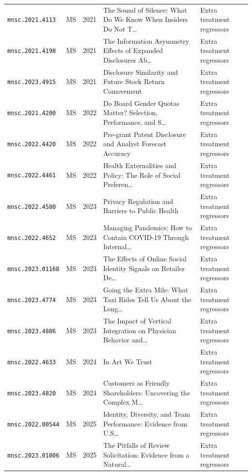 \begin{longtable}{lccp{}l}
\texttt{mnsc.2021.4113} & MS & 2021 & \raggedright The Sound of Silence: What Do We Know When Insiders Do Not T\ldots{} & Extra treatment regressors \\
\texttt{mnsc.2021.4198} & MS & 2021 & \raggedright The Information Asymmetry Effects of Expanded Disclosures Ab\ldots{} & Extra treatment regressors \\
\texttt{mnsc.2023.4915} & MS & 2021 & \raggedright Disclosure Similarity and Future Stock Return Comovement & Extra treatment regressors \\
\texttt{mnsc.2021.4200} & MS & 2022 & \raggedright Do Board Gender Quotas Matter? Selection, Performance, and S\ldots{} & Extra treatment regressors \\
\texttt{mnsc.2022.4420} & MS & 2022 & \raggedright Pre-grant Patent Disclosure and Analyst Forecast Accuracy & Extra treatment regressors \\
\texttt{mnsc.2022.4461} & MS & 2022 & \raggedright Health Externalities and Policy: The Role of Social Preferen\ldots{} & Extra treatment regressors \\
\texttt{mnsc.2022.4580} & MS & 2023 & \raggedright Privacy Regulation and Barriers to Public Health & Extra treatment regressors \\
\texttt{mnsc.2022.4652} & MS & 2023 & \raggedright Managing Pandemics: How to Contain COVID-19 Through Internal\ldots{} & Extra treatment regressors \\
\texttt{mnsc.2023.01168} & MS & 2023 & \raggedright The Effects of Online Social Identity Signals on Retailer De\ldots{} & Extra treatment regressors \\
\texttt{mnsc.2023.4774} & MS & 2023 & \raggedright Going the Extra Mile: What Taxi Rides Tell Us About the Long\ldots{} & Extra treatment regressors \\
\texttt{mnsc.2023.4886} & MS & 2023 & \raggedright The Impact of Vertical Integration on Physician Behavior and\ldots{} & Extra treatment regressors \\
\texttt{mnsc.2022.4633} & MS & 2024 & \raggedright In Art We Trust & Extra treatment regressors \\
\texttt{mnsc.2023.4820} & MS & 2024 & \raggedright Customers as Friendly Shareholders: Uncovering the Complex M\ldots{} & Extra treatment regressors \\
\texttt{mnsc.2022.00544} & MS & 2025 & \raggedright Identity, Diversity, and Team Performance: Evidence from U.S\ldots{} & Extra treatment regressors \\
\texttt{mnsc.2023.01006} & MS & 2025 & \raggedright The Pitfalls of Review Solicitation: Evidence from a Natural\ldots{} & Extra treatment regressors \\

\end{longtable}
